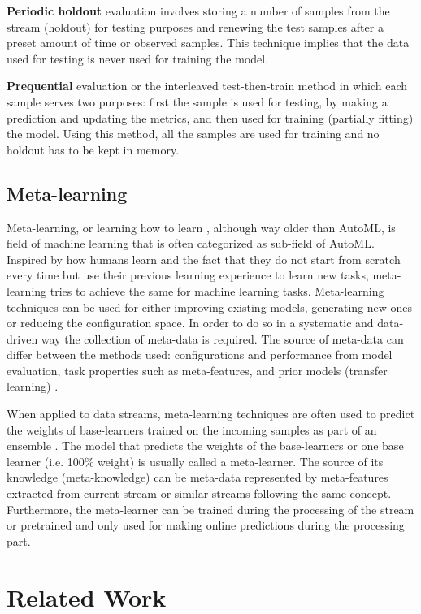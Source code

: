 \documentclass{sig-alternate-br}
\begin{document}
\textbf{Periodic holdout} evaluation involves storing a number of samples from the stream (holdout) for testing purposes and renewing the test samples after a preset amount of time or observed samples. This technique implies that the data used for testing is never used for training the model.

\textbf{Prequential} evaluation or the interleaved test-then-train method in which each sample serves two purposes: first the sample is used for testing, by making a prediction and updating the metrics, and then used for training (partially fitting) the model. Using this method, all the samples are used for training and no holdout has to be kept in memory.

\subsection{Meta-learning}

Meta-learning, or learning how to learn \cite{vanschoren2018meta}, although way older than AutoML, is field of machine learning that is often categorized as sub-field of AutoML. Inspired by how humans learn and the fact that they do not start from scratch every time but use their previous learning experience to learn new tasks, meta-learning tries to achieve the same for machine learning tasks. Meta-learning techniques can be used for either improving existing models, generating new ones or reducing the configuration space. In order to do so in a systematic and data-driven way the collection of meta-data is required. The source of meta-data can differ between the methods used: configurations and performance from model evaluation, task properties such as meta-features, and prior models (transfer learning) \cite{vanschoren2014openml}.

When applied to data streams, meta-learning techniques are often used to predict the weights of base-learners trained on the incoming samples as part of an ensemble \cite{van2018online}. The model that predicts the weights of the base-learners or one base learner (i.e. 100\% weight) is usually called a meta-learner. The source of its knowledge (meta-knowledge) can be meta-data represented by meta-features \cite{rossi2017guidance} extracted from current stream or similar streams following the same concept. Furthermore, the meta-learner can be trained during the processing of the stream or pretrained and only used for making online predictions during the processing part.

\section{Related Work}
\label{relatedwork}
\end{document}
